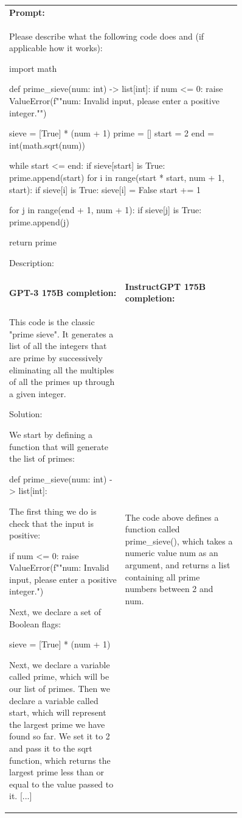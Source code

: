 \documentclass{article}
\begin{document}
\begin{figure}[hp]
    \centering
    \small
    \begin{tabular}{p{0.45\linewidth} p{0.45\linewidth}}
    \toprule 
         \multicolumn{2}{l}{\textbf{Prompt:} }  \\
         \multicolumn{2}{p{0.95\linewidth}}{Please describe what the following code does and (if applicable how it works):

import math

def prime\_sieve(num: int) -> list[int]:
  if num <= 0:
    raise ValueError(f""{num}: Invalid input, please enter a positive integer."")

  sieve = [True] * (num + 1)
  prime = []
  start = 2
  end = int(math.sqrt(num))

  while start <= end:
    if sieve[start] is True:
      prime.append(start)
      for i in range(start * start, num + 1, start):
        if sieve[i] is True:
          sieve[i] = False
    start += 1

  for j in range(end + 1, num + 1):
    if sieve[j] is True:
      prime.append(j)

  return prime

Description:
         }  \\ \midrule 
        \textbf{GPT-3 175B completion:} & \textbf{InstructGPT 175B completion:} \\
    
This code is the classic "prime sieve". It generates a list of all the integers that are prime by successively eliminating all the multiples of all the primes up through a given integer.

Solution:

We start by defining a function that will generate the list of primes:

def prime\_sieve(num: int) -> list[int]:

The first thing we do is check that the input is positive:

if num <= 0:    raise ValueError(f""{num}: Invalid input, please enter a positive integer.")

Next, we declare a set of Boolean flags:

sieve = [True] * (num + 1)

Next, we declare a variable called prime, which will be our list of primes. Then we declare a variable called start, which will represent the largest prime we have found so far. We set it to 2 and pass it to the sqrt function, which returns the largest prime less than or equal to the value passed to it. [...]
         &
         The code above defines a function called prime\_sieve(), which takes a numeric value num as an argument, and returns a list containing all prime numbers between 2 and num.


\end{tabular}
\end{figure}
\end{document}
